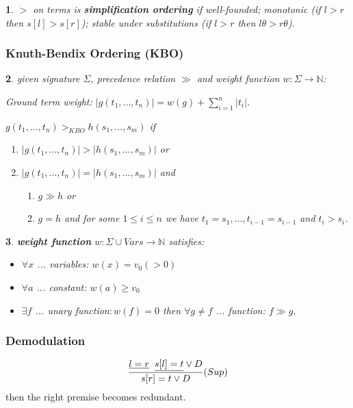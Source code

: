 \documentclass[]{article}
\newtheorem*{green}{}
\begin{document}
\begin{multicols}{3}
\begin{minipage}[t]{.31\textwidth}
\begin{green}
$>$ on terms is \textbf{simplification ordering} if well-founded; monotonic (if $l>r$ then $s[l]>s[r]$); stable under substitutions (if $l>r$ then $l\theta > r\theta$).
\end{green}


\subsubsection*{Knuth-Bendix Ordering (KBO)}
\begin{green}
given signature $\Sigma$, precedence relation $\gg$ and weight function $w:\Sigma \rightarrow \mathbb{N}$:

Ground term weight: $|g(t_1,...,t_n)| = w(g)+ \sum_{i=1}^{n}|t_i|$.

$g(t_1,...,t_n) >_{KBO} h(s_1,...,s_m)$ if
\begin{enumerate}
	\item $|g(t_1,...,t_n)| > |h(s_1,...,s_m)|$ or
	\item $|g(t_1,...,t_n)| = |h(s_1,...,s_m)|$ and
	\begin{enumerate}
		\item $g\gg h$ or
		\item $g=h$ and for some $1 \leq i \leq n$ we have $t_1=s_1,...,t_{i-1}=s_{i-1}$ and $t_i > s_i$.
	\end{enumerate}
\end{enumerate}
\end{green}

\end{minipage}\hfil

\begin{minipage}[t]{.31\textwidth}
	
\begin{green}
	\textbf{weight function} $w:\Sigma \cup Vars \rightarrow \mathbb{N}$ satisfies:
	\begin{itemize}
		\item $\forall x$ ... variables: $ w(x) = v_0 (> 0)$
		\item $\forall a$ ... constant: $w(a) \geq v_0 $
		\item $\exists f$ ... unary function$: w(f)=0$ then $\forall g\not=f$ ... function: $f \gg g$.
	\end{itemize}
\end{green}
	
\subsubsection*{Demodulation}
\begin{align*}
	\frac{\underline{l=r} \hspace{0.2cm} \underline{s[l]=t} \lor D}{s[r]=t \lor D}(Sup)
\end{align*}
then the right premise becomes redundant.


\end{minipage}
\end{multicols}
\end{document}
